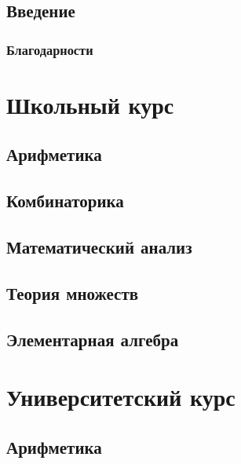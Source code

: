 \documentclass{report}
\begin{document}
\chapter*{Введение}

\section*{Благодарности}

\tableofcontents

\part{Школьный курс}
\chapter{Арифметика}

	
	
	
\chapter{Комбинаторика}

\chapter{Математический анализ}

	
	
\chapter{Теория множеств}




\chapter{Элементарная алгебра}


\part{Университетский курс}
\chapter{Арифметика}

	
	
\end{document}
